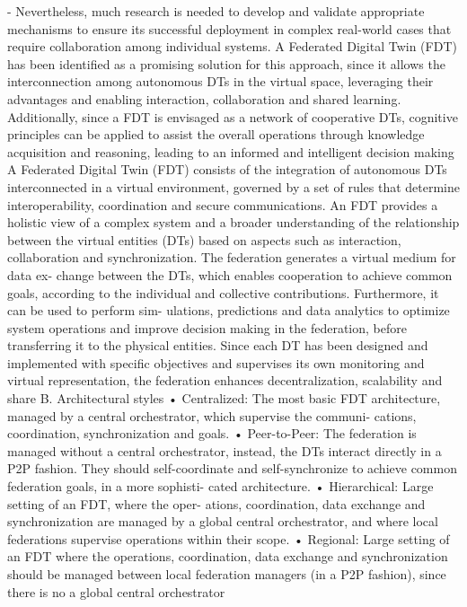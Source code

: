 \cite{vergara2023federated} - Nevertheless, much research is needed to develop and validate
appropriate mechanisms to ensure its successful deployment
in complex real-world cases that require collaboration among
individual systems. A Federated Digital Twin (FDT) has been
identified as a promising solution for this approach, since it
allows the interconnection among autonomous DTs in the virtual
space, leveraging their advantages and enabling interaction,
collaboration and shared learning. Additionally, since a FDT is
envisaged as a network of cooperative DTs, cognitive principles
can be applied to assist the overall operations through knowledge
acquisition and reasoning, leading to an informed and intelligent
decision making
A Federated Digital Twin (FDT) consists of the integration
of autonomous DTs interconnected in a virtual environment,
governed by a set of rules that determine interoperability,
coordination and secure communications. An FDT provides a
holistic view of a complex system and a broader understanding
of the relationship between the virtual entities (DTs) based on
aspects such as interaction, collaboration and synchronization.
The federation generates a virtual medium for data ex-
change between the DTs, which enables cooperation to achieve
common goals, according to the individual and collective
contributions. Furthermore, it can be used to perform sim-
ulations, predictions and data analytics to optimize system
operations and improve decision making in the federation,
before transferring it to the physical entities. Since each DT
has been designed and implemented with specific objectives
and supervises its own monitoring and virtual representation,
the federation enhances decentralization, scalability and share
B. Architectural styles
• Centralized: The most basic FDT architecture, managed
by a central orchestrator, which supervise the communi-
cations, coordination, synchronization and goals.
• Peer-to-Peer: The federation is managed without a central
orchestrator, instead, the DTs interact directly in a P2P
fashion. They should self-coordinate and self-synchronize
to achieve common federation goals, in a more sophisti-
cated architecture.
• Hierarchical: Large setting of an FDT, where the oper-
ations, coordination, data exchange and synchronization
are managed by a global central orchestrator, and where
local federations supervise operations within their scope.
• Regional: Large setting of an FDT where the operations,
coordination, data exchange and synchronization should
be managed between local federation managers (in a P2P
fashion), since there is no a global central orchestrator


